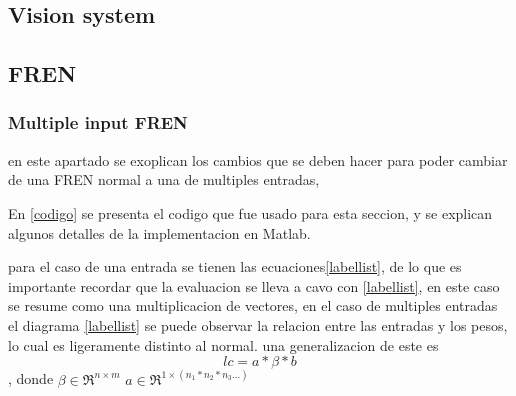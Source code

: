     \subsection{Vision system}
    
    
    \subsection{FREN}
    
    
    
    \subsubsection{Multiple input FREN}
    
    
    
    en este apartado se exoplican los cambios que se deben hacer para poder cambiar de una FREN normal a una de multiples entradas, 
    
    
    
    En \cref{codigo} se presenta el codigo que fue usado para esta seccion, y se explican algunos detalles de la implementacion en Matlab.
    
    
    para el caso de una entrada se tienen las ecuaciones\cref{labellist}, de lo que es importante recordar que la evaluacion se lleva a cavo con \cref{labellist}, en este caso se resume como una multiplicacion de vectores, en el caso de multiples entradas el diagrama \cref{labellist} se puede observar la relacion entre las entradas y los pesos, lo cual es ligeramente distinto al normal. una generalizacion de este es \begin{equation}
    lc=a*\beta * b
    \end{equation}, donde $\beta \in \Re^{n \times m} $ $a \in \Re^{1\times (n_1*n_2*n_3...)} $
    
    
    
    